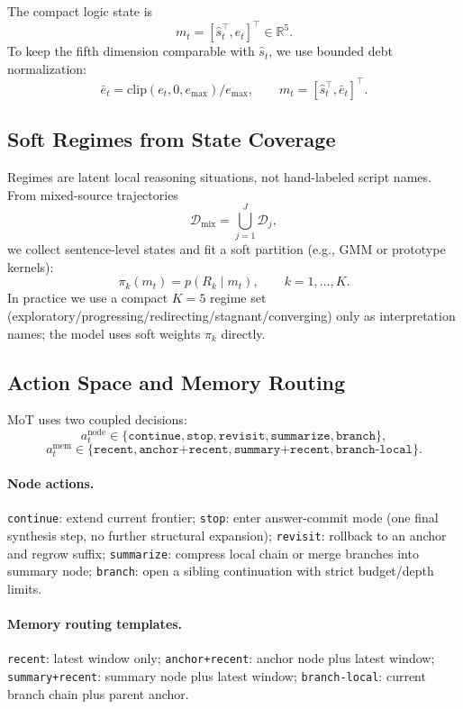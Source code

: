 \documentclass{article}
\newcommand{\R}{\mathbb{R}}
\begin{document}
The compact logic state is
\begin{equation}
m_t=[\hat s_t^\top,e_t]^\top \in \R^5.
\label{eq:mt}
\end{equation}
To keep the fifth dimension comparable with $\hat s_t$, we use bounded debt normalization:
\begin{equation}
\bar e_t=\mathrm{clip}(e_t,0,e_{\max})/e_{\max},\qquad
m_t=[\hat s_t^\top,\bar e_t]^\top.
\label{eq:enorm}
\end{equation}

\subsection{Soft Regimes from State Coverage}
\label{sec:regime}
Regimes are latent local reasoning situations, not hand-labeled script names. From mixed-source trajectories
\[
\mathcal{D}_{\mathrm{mix}}=\bigcup_{j=1}^{J}\mathcal{D}_j,
\]
we collect sentence-level states and fit a soft partition (e.g., GMM or prototype kernels):
\begin{equation}
\pi_k(m_t)=p(R_k\mid m_t),\qquad k=1,\dots,K.
\label{eq:softregime}
\end{equation}
In practice we use a compact $K=5$ regime set (exploratory/progressing/redirecting/stagnant/converging) only as interpretation names; the model uses soft weights $\pi_k$ directly.

\subsection{Action Space and Memory Routing}
\label{sec:action}
MoT uses two coupled decisions:
\[
a_t^{\text{node}} \in \{\texttt{continue},\texttt{stop},\texttt{revisit},\texttt{summarize},\texttt{branch}\},
\]
\[
a_t^{\text{mem}} \in \{\texttt{recent},\texttt{anchor+recent},\texttt{summary+recent},\texttt{branch-local}\}.
\]

\paragraph{Node actions.}
\texttt{continue}: extend current frontier; 
\texttt{stop}: enter answer-commit mode (one final synthesis step, no further structural expansion);
\texttt{revisit}: rollback to an anchor and regrow suffix;
\texttt{summarize}: compress local chain or merge branches into summary node;
\texttt{branch}: open a sibling continuation with strict budget/depth limits.

\paragraph{Memory routing templates.}
\texttt{recent}: latest window only;
\texttt{anchor+recent}: anchor node plus latest window;
\texttt{summary+recent}: summary node plus latest window;
\texttt{branch-local}: current branch chain plus parent anchor.
\end{document}
